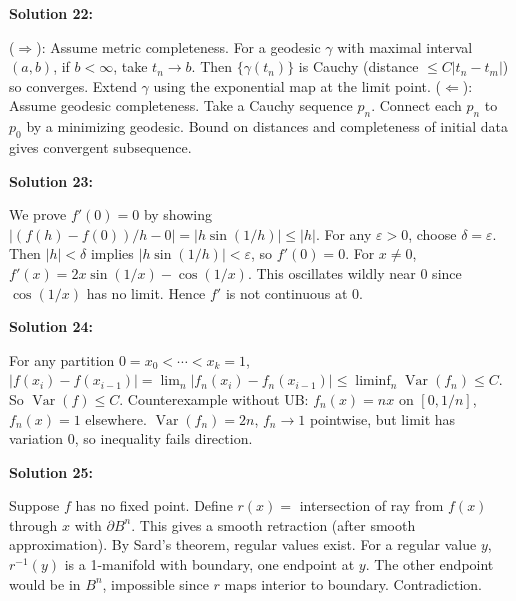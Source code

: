 \documentclass[12pt,a4paper]{exam}
\begin{document}
\vspace{0.5cm}

\textbf{Solution 22:}

($\Rightarrow$): Assume metric completeness. For a geodesic $\gamma$ with maximal interval $(a,b)$, if $b < \infty$, take $t_n \to b$. Then $\{\gamma(t_n)\}$ is Cauchy (distance $\leq C|t_n - t_m|$) so converges. Extend $\gamma$ using the exponential map at the limit point. ($\Leftarrow$): Assume geodesic completeness. Take a Cauchy sequence $p_n$. Connect each $p_n$ to $p_0$ by a minimizing geodesic. Bound on distances and completeness of initial data gives convergent subsequence.

\vspace{0.5cm}

\textbf{Solution 23:}

We prove $f'(0) = 0$ by showing $|(f(h) - f(0))/h - 0| = |h \sin(1/h)| \leq |h|$. For any $\varepsilon > 0$, choose $\delta = \varepsilon$. Then $|h| < \delta$ implies $|h \sin(1/h)| < \varepsilon$, so $f'(0)=0$. For $x \neq 0$, $f'(x) = 2x \sin(1/x) - \cos(1/x)$. This oscillates wildly near 0 since $\cos(1/x)$ has no limit. Hence $f'$ is not continuous at 0.

\vspace{0.5cm}

\textbf{Solution 24:}

For any partition $0 = x_0 < \cdots < x_k = 1$, $|f(x_i) - f(x_{i-1})| = \lim_n |f_n(x_i) - f_n(x_{i-1})| \leq \liminf_n \operatorname{Var}(f_n) \leq C$. So $\operatorname{Var}(f) \leq C$. Counterexample without UB: $f_n(x) = n x$ on $[0,1/n]$, $f_n(x)=1$ elsewhere. $\operatorname{Var}(f_n) = 2n$, $f_n \to 1$ pointwise, but limit has variation 0, so inequality fails direction.

\vspace{0.5cm}

\textbf{Solution 25:}

Suppose $f$ has no fixed point. Define $r(x) =$ intersection of ray from $f(x)$ through $x$ with $\partial B^n$. This gives a smooth retraction (after smooth approximation). By Sard's theorem, regular values exist. For a regular value $y$, $r^{-1}(y)$ is a 1-manifold with boundary, one endpoint at $y$. The other endpoint would be in $B^n$, impossible since $r$ maps interior to boundary. Contradiction.

\vspace{0.5cm}
\end{document}
